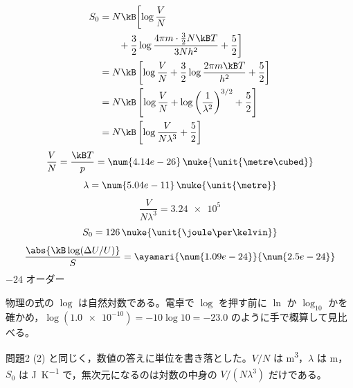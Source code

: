 \begin{align*}
S_{0}&=N\kB\biggl[\log\frac{V}{N}\\
&\qquad+\frac{3}{2}\log\frac{4\pi m\cdot\frac{3}{2}N\kB T}{3Nh^{2}}+\frac{5}{2}\biggr]\\
&=N\kB\left[\log\frac{V}{N}+\frac{3}{2}\log\frac{2\pi m\kB T}{h^{2}}+\frac{5}{2}\right]\\
&=N\kB\left[\log\frac{V}{N}+\log\left(\frac{1}{\lambda^{2}}\right)^{3/2}+\frac{5}{2}\right]\\
&=N\kB\left[\log\frac{V}{N\lambda^{3}}+\frac{5}{2}\right]
\end{align*}
\[ \frac{V}{N}=\frac{\kB T}{p}=\num{4.14e-26}\,\nuke{\unit{\metre\cubed}} \]
\[ \lambda=\num{5.04e-11}\,\nuke{\unit{\metre}} \]
\[ \frac{V}{N\lambda^{3}}=\num{3.24e5} \]
\[ S_{0}=126\,\nuke{\unit{\joule\per\kelvin}} \]
\[ \frac{\abs{\kB\log(\Delta U/U)}}{S}=\ayamari{\num{1.09e-24}}{\num{2.5e-24}} \]
$-24$ オーダー
\item 物理の式の $\log$ は自然対数である。電卓で $\log$ を押す前に $\ln$ か $\log_{10}$ かを確かめ，$\log(\num{1.0e-10})=-10\log10=-\num{23.0}$ のように手で概算して見比べる。
\item 問題2 (2) と同じく，数値の答えに単位を書き落とした。$V/N$ は \unit{\metre\cubed}，$\lambda$ は \unit{\metre}，$S_{0}$ は \unit{\joule\per\kelvin} で，無次元になるのは対数の中身の $V/(N\lambda^{3})$ だけである。
